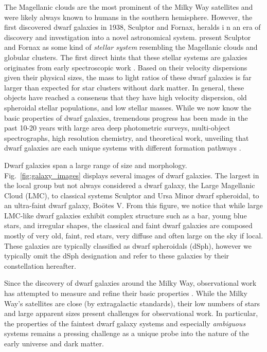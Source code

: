 The Magellanic clouds are the most prominent of the Milky Way satellites
and were likely always known to humans in the southern hemisphere.
However, the first discovered dwarf galaxies in 1938, Sculptor and
Fornax, heralds i n an era of discovery and investigation into a novel
astronomical system. \citet{shapley1938} present Sculptor and Fornax as
some kind of \emph{stellar system} resembling the Magellanic clouds and
globular clusters. The first direct hints that these stellar systems are
galaxies originates from early spectroscopic work
\citep[e.g.,][\citet{gallagher+wyse1994}, \citet{mateo1994},
\citet{pryor1994}, \citet{pryor1996}, \citet{gerhard1994}, and
\citet{olszewski1998}.]{aaronson1983}. Based on their velocity
dispersions given their physical sizes, the mass to light ratios of
these dwarf galaxies is far larger than expected for star clusters
without dark matter. In general, these objects have reached a consensus
that they have high velocity dispersion, old spheroidal stellar
populations, and low stellar masses. While we now know the basic
properties of dwarf galaxies, tremendous progress has been made in the
past 10-20 years with large area deep photometric surveys, multi-object
spectrographs, high resolution chemistry, and theoretical work,
unveiling that dwarf galaxies are each unique systems with different
formation pathways \citep[e.g.][]{simon2019}.

Dwarf galaxies span a large range of size and morphology.
Fig.~\ref{fig:galaxy_images} displays several images of dwarf galaxies.
The largest in the local group but not always considered a dwarf galaxy,
the Large Magellanic Cloud (LMC), to classical systems Sculptor and Ursa
Minor dwarf spheroidal, to an ultra-faint dwarf galaxy, Boötes V. From
this figure, we notice that while large LMC-like dwarf galaxies exhibit
complex structure such as a bar, young blue stars, and irregular shapes,
the classical and faint dwarf galaxies are composed mostly of very old,
faint, red stars, very diffuse and often large on the sky if local.
These galaxies are typically classified as dwarf spheroidals (dSph),
however we typically omit the dSph designation and refer to these
galaxies by their constellation hereafter.

Since the discovery of dwarf galaxies around the Milky Way,
observational work has attempted to measure and refine their basic
properties \citep[e.g.][]{mateo1998}. While the Milky Way's satellites
are close (by extragalactic standards), their low numbers of stars and
large apparent sizes present challenges for observational work. In
particular, the properties of the faintest dwarf galaxy systems and
especially \emph{ambiguous} systems remains a pressing challenge as a
unique probe into the nature of the early universe and dark matter.

